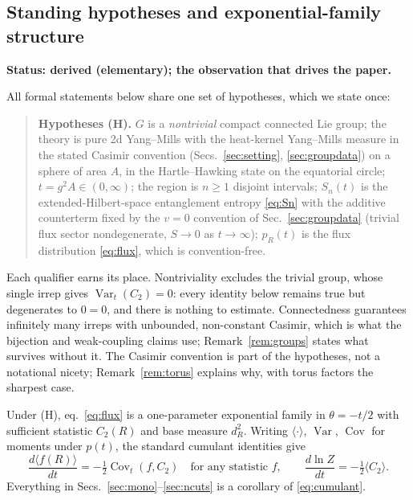 \documentclass[11pt]{article}
\theoremstyle{remark}
\theoremstyle{plain}
\newcommand{\Var}{\operatorname{Var}}
\newcommand{\Cov}{\operatorname{Cov}}
\begin{document}
\subsection{Standing hypotheses and exponential-family structure}

\textbf{Status: derived (elementary); the observation that drives the paper.}

All formal statements below share one set of hypotheses, which we state once:

\begin{quote}
\textbf{Hypotheses (H).} $G$ is a \emph{nontrivial} compact connected Lie group; the theory is pure 2d Yang--Mills with the heat-kernel Yang--Mills measure in the stated Casimir convention (Secs.~\ref{sec:setting}, \ref{sec:groupdata}) on a sphere of area $A$, in the Hartle--Hawking state on the equatorial circle; $t = g^2 A \in (0,\infty)$; the region is $n \geq 1$ disjoint intervals; $S_n(t)$ is the extended-Hilbert-space entanglement entropy \eqref{eq:Sn} with the additive counterterm fixed by the $v = 0$ convention of Sec.~\ref{sec:groupdata} (trivial flux sector nondegenerate, $S \to 0$ as $t \to \infty$); $p_R(t)$ is the flux distribution \eqref{eq:flux}, which is convention-free.
\end{quote}

Each qualifier earns its place. Nontriviality excludes the trivial group, whose single irrep gives $\Var_t(C_2) = 0$: every identity below remains true but degenerates to $0 = 0$, and there is nothing to estimate. Connectedness guarantees infinitely many irreps with unbounded, non-constant Casimir, which is what the bijection and weak-coupling claims use; Remark~\ref{rem:groups} states what survives without it. The Casimir convention is part of the hypotheses, not a notational nicety; Remark~\ref{rem:torus} explains why, with torus factors the sharpest case.

Under (H), eq.~\eqref{eq:flux} is a one-parameter exponential family in $\theta = -t/2$ with sufficient statistic $C_2(R)$ and base measure $d_R^2$. Writing $\langle\cdot\rangle$, $\Var$, $\Cov$ for moments under $p(t)$, the standard cumulant identities give
\begin{equation}\label{eq:cumulant}
\frac{d\langle f(R)\rangle}{dt} = -\tfrac12 \Cov_t(f, C_2) \quad \text{for any statistic } f, \qquad \frac{d \ln Z}{dt} = -\tfrac12\langle C_2\rangle.
\end{equation}
Everything in Secs.~\ref{sec:mono}--\ref{sec:ncuts} is a corollary of \eqref{eq:cumulant}.
\end{document}
